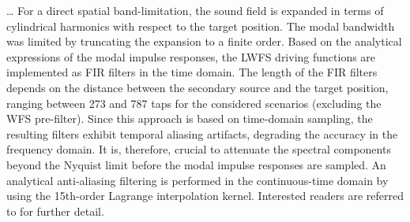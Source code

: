 \ldots
For a direct spatial band-limitation,
the sound field is expanded in terms of cylindrical harmonics with respect to the target position.
The modal bandwidth was limited by truncating the expansion to a finite order.
Based on the analytical expressions of the modal impulse responses,
the LWFS driving functions are implemented as FIR filters in the time domain.
The length of the FIR filters depends on the distance between the secondary source and the target position,
ranging between 273 and 787 taps for the considered scenarios
(excluding the WFS pre-filter).
%
Since this approach is based on time-domain sampling,
the resulting filters exhibit temporal aliasing artifacts,
degrading the accuracy in the frequency domain.
It is, therefore, crucial to attenuate the spectral components beyond the Nyquist limit
before the modal impulse responses are sampled.
An analytical anti-aliasing filtering is performed in the continuous-time domain
by using the 15th-order Lagrange interpolation kernel.
%
Interested readers are referred to \cite{hahn2022cylindrical} for further detail.
